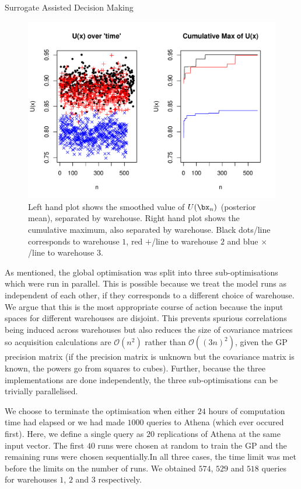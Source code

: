 \begin{chapter}{Surrogate Assisted Decision Making \label{Chap:optimisation}}
\begin{figure}
  \centering
  \includegraphics[width=\textwidth]{fig-optim2/trace-EI2.pdf}
  \caption{Left hand plot shows the smoothed value of $U(\bx_n)$ (posterior mean), separated by warehouse. Right hand plot shows the cumulative maximum, also separated by warehouse. Black dots/line corresponds to warehouse $1$, red $+$/line to warehouse $2$ and blue $\times$/line to warehouse $3$.}
  \label{Fig:EI-trace}
\end{figure}


As mentioned, the global optimisation was split into three sub-optimisations which were run in parallel. This is possible because we treat the model runs as independent of each other, if they corresponds to a different choice of warehouse. We argue that this is the most appropriate course of action because the input spaces for different warehouses are disjoint. %
 This prevents spurious correlations being induced across warehouses but also reduces the size of covariance matrices so acquisition calculations are $\mathcal{O}(n^2 )$ rather than $\mathcal{O}((3n)^2)$, given the GP precision matrix (if the precision matrix is unknown but the covariance matrix is known, the powers go from squares to cubes). Further, because the three implementations are done independently, the three sub-optimisations can be trivially parallelised.

We choose to terminate the optimisation when either $24$ hours of computation time had elapsed or we had made $1000$ queries to Athena (which ever occured first). Here, we define a single query as $20$ replications of Athena at the same input vector. The first $40$ runs were chosen at random to train the GP and the remaining runs were chosen sequentially.In all three cases, the time limit was met before the limits on the number of runs. We obtained $574$, $529$ and $518$ queries for warehouses $1$, $2$ and $3$ respectively.


\end{chapter}

